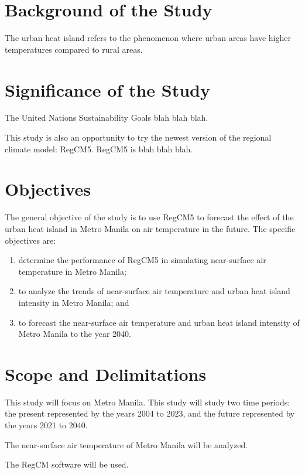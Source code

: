 \section{Background of the Study}
	The urban heat island refers to the phenomenon where urban areas have higher temperatures compared to rural areas.
	
\section{Significance of the Study}
	The United Nations Sustainability Goals blah blah blah.
	
	This study is also an opportunity to try the newest version of the regional climate model: RegCM5. RegCM5 is blah blah blah.

\section{Objectives}
	The general objective of the study is to use RegCM5 to forecast the effect of the urban heat island in Metro Manila on air temperature in the future.
	The specific objectives are:
	\begin{enumerate}
		\item determine the performance of RegCM5 in simulating near-surface air temperature in Metro Manila;
		\item to analyze the trends of near-surface air temperature and urban heat island intensity in Metro Manila; and
		\item to forecast the near-surface air temperature and urban heat island intensity of Metro Manila to the year 2040.
		
	\end{enumerate}
	

\section{Scope and Delimitations}
	This study will focus on Metro Manila.
	This study will study two time periods: 
		the present represented by the years 2004 to 2023, 
		and the future represented by the years 2021 to 2040.
	
	The near-surface air temperature of Metro Manila will be analyzed.
	
	The RegCM software will be used.